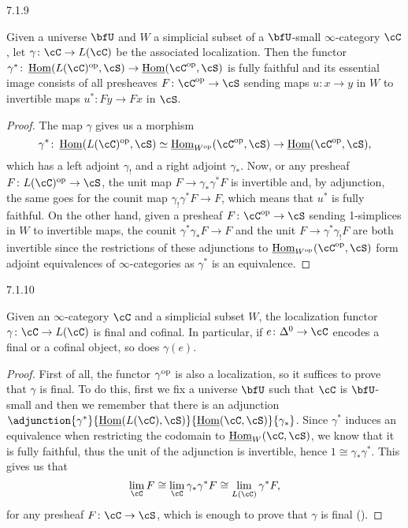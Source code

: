 \documentclass[a4paper,fontsize=12pt]{scrartcl}
\begin{document}
\begin{prop}
  7.1.9

  Given a universe $\bfU$ and $W$ a simplicial subset of a $\bfU$-small
  $\infty$-category $\cC$, let $\gamma\colon\cC\rightarrow L(\cC)$ be the
  associated localization. Then the functor
  $\gamma^*\colon\Home(L(\cC)^{\op},\cS)\rightarrow\Home(\cC^{\op},\cS)$ is
  fully faithful and its essential image consists of all presheaves
  $F\colon\cC^{\op}\rightarrow\cS$ sending maps $u\colon x\rightarrow y$ in $W$
  to invertible maps $u^*\colon Fy\rightarrow Fx$ in $\cS$.
\end{prop}
\begin{proof}
  The map $\gamma$ gives us a morphism
  \[\gamma^*\colon\Home(L(\cC)^{\op},\cS)\simeq\Home_{W^{\op}}(\cC^{\op},\cS)\rightarrow\Home(\cC^{\op},\cS),\]
  which has a left adjoint $\gamma_!$ and a right adjoint $\gamma_*$. Now, or
  any presheaf $F\colon L(\cC)^{\op}\rightarrow\cS$, the unit map
  $F\rightarrow\gamma_*\gamma^*F$ is invertible and, by adjunction, the same
  goes for the counit map $\gamma_!\gamma^*F\rightarrow F$, which means that
  $u^*$ is fully faithful. On the other hand, given a presheaf
  $F\colon\cC^{\op}\rightarrow\cS$ sending 1-simplices in $W$ to invertible maps,
  the counit $\gamma^*\gamma_*F\rightarrow F$ and the unit
  $F\rightarrow\gamma^*\gamma_!F$ are both invertible since the restrictions of
  these adjunctions to $\Home_{W^{\op}}(\cC^{\op},\cS)$ form adjoint
  equivalences of $\infty$-categories as $\gamma^*$ is an equivalence.
\end{proof}

\begin{prop}\label{7110}
  7.1.10

  Given an $\infty$-category $\cC$ and a simplicial subset $W$, the localization
  functor $\gamma\colon\cC\rightarrow L(\cC)$ is final and cofinal. In
  particular, if $e\colon\Delta^0\rightarrow\cC$ encodes a final or a cofinal
  object, so does $\gamma(e)$.
\end{prop}
\begin{proof}
  First of all, the functor $\gamma^{\operatorname{op}}$ is also a localization, so it
  suffices to prove that $\gamma$ is final. To do this, first we fix a universe
  $\bfU$ such that $\cC$ is $\bfU$-small and then we remember that there
  is an adjunction
  $\adjunction{\gamma^*}{\Home(L(\cC),\cS)}{\Home(\cC,\cS)}{\gamma_*}$. Since
  $\gamma^*$ induces an equivalence when restricting the codomain to
  $\Home_W(\cC,\cS)$, we know that it is fully faithful, thus the unit of the
  adjunction is invertible, hence $1\cong\gamma_*\gamma^*$. This gives us that
  \[\lim_{\cC}F\cong\lim_{\cC}\gamma_*\gamma^*F\cong\lim_{L(\cC)}\gamma^*F,\]
  for any presheaf $F\colon\cC\rightarrow\cS$, which is enough to prove that
  $\gamma$ is final (\cite[Thm.\ 6.4.5]{Cis19}).
\end{proof}
\end{document}
